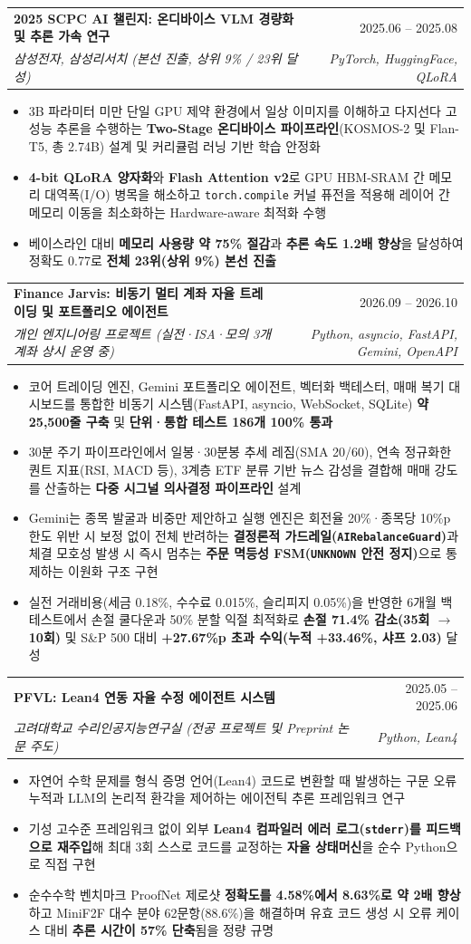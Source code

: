 \documentclass[letterpaper,10pt]{article}
\makeatletter
\newcommand{\resumeItem}[1]{\item\small{#1}}
\newcommand{\resumeSubheading}[4]{
\vspace{-1pt}\item
  \begin{tabular*}{0.97\textwidth}[t]{p{0.80\textwidth}@{\extracolsep{\fill}}r}
    \textbf{#1} & #2 \\
    \textit{#3} & \textit{#4} \\
  \end{tabular*}\vspace{-5pt}
}
\newcommand{\resumeSubHeadingList}{\begin{itemize}[leftmargin=0.15in, label={}]}
\newcommand{\resumeSubHeadingListEnd}{\end{itemize}}
\makeatother
\begin{document}
  \resumeSubheading
      {2025 SCPC AI 챌린지: 온디바이스 VLM 경량화 및 추론 가속 연구}{2025.06 -- 2025.08}
      {삼성전자, 삼성리서치 (본선 진출, 상위 9\% / 23위 달성)}{PyTorch, HuggingFace, QLoRA}
      \resumeSubHeadingList
          \resumeItem{3B 파라미터 미만 단일 GPU 제약 환경에서 일상 이미지를 이해하고 다지선다 고성능 추론을 수행하는 \textbf{Two-Stage 온디바이스 파이프라인}(KOSMOS-2 및 Flan-T5, 총 2.74B) 설계 및 커리큘럼 러닝 기반 학습 안정화}
          \resumeItem{\textbf{4-bit QLoRA 양자화}와 \textbf{Flash Attention v2}로 GPU HBM-SRAM 간 메모리 대역폭(I/O) 병목을 해소하고 \texttt{torch.compile} 커널 퓨전을 적용해 레이어 간 메모리 이동을 최소화하는 Hardware-aware 최적화 수행}
          \resumeItem{베이스라인 대비 \textbf{메모리 사용량 약 75\% 절감}과 \textbf{추론 속도 1.2배 향상}을 달성하여 정확도 0.77로 \textbf{전체 23위(상위 9\%) 본선 진출}}
      \resumeSubHeadingListEnd

  \resumeSubheading
      {Finance Jarvis: 비동기 멀티 계좌 자율 트레이딩 및 포트폴리오 에이전트}{2026.09 -- 2026.10}
      {개인 엔지니어링 프로젝트 (실전·ISA·모의 3개 계좌 상시 운영 중)}{Python, asyncio, FastAPI, Gemini, OpenAPI}
      \resumeSubHeadingList
          \resumeItem{코어 트레이딩 엔진, Gemini 포트폴리오 에이전트, 벡터화 백테스터, 매매 복기 대시보드를 통합한 비동기 시스템(FastAPI, asyncio, WebSocket, SQLite) \textbf{약 25,500줄 구축} 및 \textbf{단위·통합 테스트 186개 100\% 통과}}
          \resumeItem{30분 주기 파이프라인에서 일봉·30분봉 추세 레짐(SMA 20/60), 연속 정규화한 퀀트 지표(RSI, MACD 등), 3계층 ETF 분류 기반 뉴스 감성을 결합해 매매 강도를 산출하는 \textbf{다중 시그널 의사결정 파이프라인} 설계}
          \resumeItem{Gemini는 종목 발굴과 비중만 제안하고 실행 엔진은 회전율 20\%·종목당 10\%p 한도 위반 시 보정 없이 전체 반려하는 \textbf{결정론적 가드레일(\texttt{AIRebalanceGuard})}과 체결 모호성 발생 시 즉시 멈추는 \textbf{주문 멱등성 FSM(\texttt{UNKNOWN} 안전 정지)}으로 통제하는 이원화 구조 구현}
          \resumeItem{실전 거래비용(세금 0.18\%, 수수료 0.015\%, 슬리피지 0.05\%)을 반영한 6개월 백테스트에서 손절 쿨다운과 50\% 분할 익절 최적화로 \textbf{손절 71.4\% 감소(35회 $\rightarrow$ 10회)} 및 S\&P 500 대비 \textbf{+27.67\%p 초과 수익(누적 +33.46\%, 샤프 2.03)} 달성}
      \resumeSubHeadingListEnd

  \resumeSubheading
      {PFVL: Lean4 연동 자율 수정 에이전트 시스템}{2025.05 -- 2025.06}
      {고려대학교 수리인공지능연구실 (전공 프로젝트 및 Preprint 논문 주도)}{Python, Lean4}
      \resumeSubHeadingList
          \resumeItem{자연어 수학 문제를 형식 증명 언어(Lean4) 코드로 변환할 때 발생하는 구문 오류 누적과 LLM의 논리적 환각을 제어하는 에이전틱 추론 프레임워크 연구}
          \resumeItem{기성 고수준 프레임워크 없이 외부 \textbf{Lean4 컴파일러 에러 로그(\texttt{stderr})를 피드백으로 재주입}해 최대 3회 스스로 코드를 교정하는 \textbf{자율 상태머신}을 순수 Python으로 직접 구현}
          \resumeItem{순수수학 벤치마크 ProofNet 제로샷 \textbf{정확도를 4.58\%에서 8.63\%로 약 2배 향상}하고 MiniF2F 대수 분야 62문항(88.6\%)을 해결하며 유효 코드 생성 시 오류 케이스 대비 \textbf{추론 시간이 57\% 단축}됨을 정량 규명}
      \resumeSubHeadingListEnd
\end{document}
